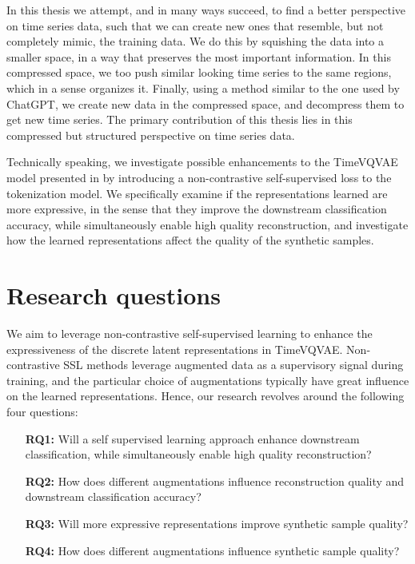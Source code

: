 \documentclass[../../thesis.tex]{subfiles}
\begin{document}
In this thesis we attempt, and in many ways succeed, to find a better perspective on time series data, such that we can create new ones that resemble, but not completely mimic, the training data. We do this by squishing the data into a smaller space, in a way that preserves the most important information. In this compressed space, we too push similar looking time series to the same regions, which in a sense organizes it. Finally, using a method similar to the one used by ChatGPT, we create new data in the compressed space, and decompress them to get new time series. The primary contribution of this thesis lies in this compressed but structured perspective on time series data.
\newline

Technically speaking, we investigate possible enhancements to the TimeVQVAE model presented in \cite{TimeVQVAE} by introducing a non-contrastive self-supervised loss to the tokenization model. We specifically examine if the representations learned are more expressive, in the sense that they improve the downstream classification accuracy, while simultaneously enable high quality reconstruction, and investigate how the learned representations affect the quality of the synthetic samples.

\section{Research questions}

We aim to leverage non-contrastive self-supervised learning to enhance the expressiveness of the discrete latent representations in TimeVQVAE. Non-contrastive SSL methods leverage augmented data as a supervisory signal during training, and the particular choice of augmentations typically have great influence on the learned representations. Hence, our research revolves around the following four questions:
\begin{itemize}
	\item[\textbf{RQ1:}] Will a self supervised learning approach enhance downstream classification, while simultaneously enable high quality reconstruction?
	\item[\textbf{RQ2:}] How does different augmentations influence reconstruction quality and downstream classification accuracy? 
	\item[\textbf{RQ3:}] Will more expressive representations improve synthetic sample quality?
	\item[\textbf{RQ4:}] How does different augmentations influence synthetic sample quality?
\end{itemize}
\end{document}
